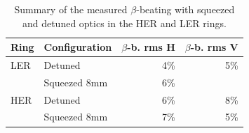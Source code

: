 \FloatBarrier
\subsubsection{}

\begin{table}
    \centering
    \begin{tabular}{llrr}
        \toprule
        Ring & Configuration & $\beta$-b. rms H & $\beta$-b. rms V \\
        \midrule
        LER  &  Detuned      & 4\%              & 5\%   \\
            &  Squeezed 8mm & 6\%              &       \\
        HER  &  Detuned      & 6\%              & 8\%  \\
            &  Squeezed 8mm & 7\%              & 5\%  \\
        \bottomrule
    \end{tabular}
    \caption{Summary of the measured $\beta$-beating with squeezed and detuned optics in the HER
    and LER rings.}
    \label{tab:kek:summary_beating}
\end{table}



\FloatBarrier
\subsection{}

\FloatBarrier
\subsubsection{}


